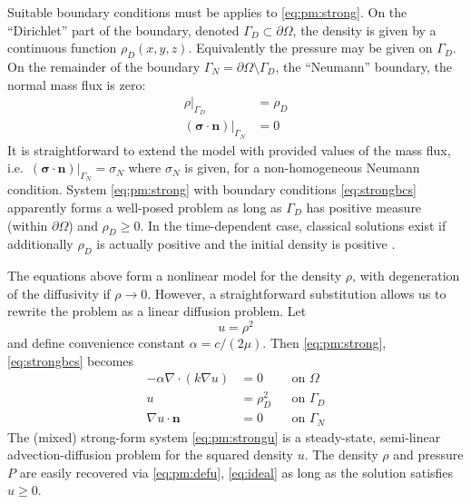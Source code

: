 \documentclass[11pt]{amsart}
\newcommand{\bn}{\mathbf{n}}
\newcommand{\bsigma}{\bm{\sigma}}
\newcommand{\Div}{\nabla\cdot}
\newcommand{\grad}{\nabla}
\begin{document}
Suitable boundary conditions must be applies to \eqref{eq:pm:strong}.  On the ``Dirichlet'' part of the boundary, denoted $\Gamma_D \subset \partial\Omega$, the density is given by a continuous function $\rho_D(x,y,z)$.  Equivalently the pressure may be given on $\Gamma_D$.  On the remainder of the boundary $\Gamma_N = \partial\Omega \setminus \Gamma_D$, the ``Neumann'' boundary, the normal mass flux is zero:
\begin{subequations}
\label{eq:strongbcs}
\begin{align}
\rho|_{\Gamma_D}               &= \rho_D \\
(\bsigma\cdot \bn)|_{\Gamma_N} &= 0
\end{align}
\end{subequations}
It is straightforward to extend the model with provided values of the mass flux, i.e.~$(\bsigma\cdot \bn)|_{\Gamma_N}= \sigma_N$ where $\sigma_N$ is given, for a non-homogeneous Neumann condition.  System \eqref{eq:pm:strong} with boundary conditions \eqref{eq:strongbcs} apparently forms a well-posed problem as long as $\Gamma_D$ has positive measure (within $\partial\Omega$) and $\rho_D\ge 0$.  In the time-dependent case, classical solutions exist if additionally $\rho_D$ is actually positive and the initial density is positive \citep[Theorem 3.1]{Vazquez2007}.

The equations above form a nonlinear model for the density $\rho$, with degeneration of the diffusivity if $\rho \to 0$.  However, a straightforward substitution allows us to rewrite the problem as a linear diffusion problem.  Let
\begin{equation}
u = \rho^2 \label{eq:pm:defu}
\end{equation}
and define convenience constant $\alpha = c/(2\mu)$.  Then \eqref{eq:pm:strong}, \eqref{eq:strongbcs} becomes
\begin{subequations}
\label{eq:pm:strongu}
\begin{align}
- \alpha \Div\left(k \grad u \right) &= 0 & &\text{on } \Omega \label{eq:pm:strongu:eqn} \\
u &= \rho_D^2 & &\text{on } \Gamma_D  \label{eq:pm:strongu:bcD} \\
\grad u \cdot \bn &= 0 & &\text{on } \Gamma_N  \label{eq:pm:strongu:bcN} 
\end{align}
\end{subequations}
The (mixed) strong-form system \eqref{eq:pm:strongu} is a steady-state, semi-linear advection-diffusion problem for the squared density $u$.  The density $\rho$ and pressure $P$ are easily recovered via \eqref{eq:pm:defu}, \eqref{eq:ideal} as long as the solution satisfies $u\ge 0$.
\end{document}

